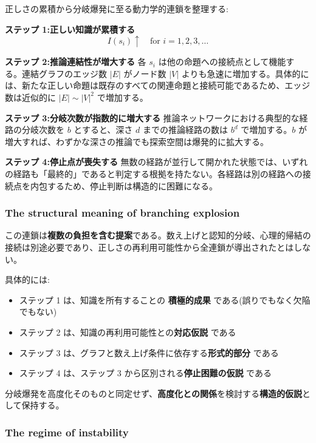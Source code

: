 正しさの累積から分岐爆発に至る動力学的連鎖を整理する:

\textbf{ステップ 1:正しい知識が累積する}
\[
I(s_i) \uparrow \quad \text{for } i = 1, 2, 3, \dots
\]

\textbf{ステップ 2:推論連結性が増大する}
各 $s_i$ は他の命題への接続点として機能する。連結グラフのエッジ数 $|E|$ がノード数 $|V|$ よりも急速に増加する。具体的には、新たな正しい命題は既存のすべての関連命題と接続可能であるため、エッジ数は近似的に $|E| \sim |V|^2$ で増加する。

\textbf{ステップ 3:分岐次数が指数的に増大する}
推論ネットワークにおける典型的な経路の分岐次数を $b$ とすると、深さ $d$ までの推論経路の数は $b^d$ で増加する。$b$ が増大すれば、わずかな深さの推論でも探索空間は爆発的に拡大する。

\textbf{ステップ 4:停止点が喪失する}
無数の経路が並行して開かれた状態では、いずれの経路も「最終的」であると判定する根拠を持たない。各経路は別の経路への接続点を内包するため、停止判断は構造的に困難になる。

\subsubsection{The structural meaning of branching explosion}


この連鎖は\textbf{複数の負担を含む提案}である。数え上げと認知的分岐、心理的帰結の接続は別途必要であり、正しさの再利用可能性から全連鎖が導出されたとはしない。

具体的には:

\begin{itemize}
\item ステップ 1 は、知識を所有することの \textbf{積極的成果} である(誤りでもなく欠陥でもない)
\item ステップ 2 は、知識の再利用可能性との\textbf{対応仮説} である
\item ステップ 3 は、グラフと数え上げ条件に依存する\textbf{形式的部分} である
\item ステップ 4 は、ステップ 3 から区別される\textbf{停止困難の仮説} である
\end{itemize}

分岐爆発を高度化そのものと同定せず、\textbf{高度化との関係}を検討する\textbf{構造的仮説}として保持する。

\subsubsection{The regime of instability}


